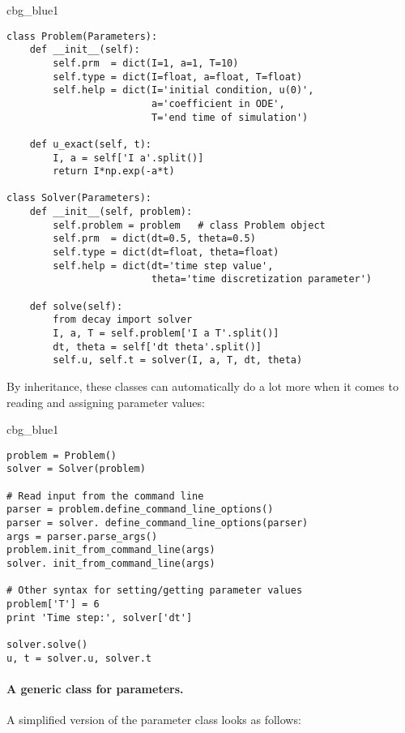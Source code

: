 \documentclass[graybox,sectrefs,envcountresetchap,open=right,final]{svmonodo}
\newenvironment{_cod_tight}[1]{
   \def\FrameCommand{\colorbox{#1}}
   \FrameRule0.6pt\MakeFramed {\FrameRestore}\vskip3mm}
   {\vskip0mm\endMakeFramed}
\newenvironment{cod}[1]{
\bgroup\rmfamily
\fboxsep=0mm\relax
\begin{_cod_tight}{#1}
\list{}{\parsep=-2mm\parskip=0mm\topsep=0pt\leftmargin=2mm
\rightmargin=2\leftmargin\leftmargin=4pt\relax}
\item\relax}
{\endlist\end{_cod_tight}\egroup}
\begin{document}
\begin{cod}{cbg_blue1}\begin{Verbatim}[numbers=none,fontsize=\fontsize{9pt}{9pt},baselinestretch=0.95,xleftmargin=2mm]
class Problem(Parameters):
    def __init__(self):
        self.prm  = dict(I=1, a=1, T=10)
        self.type = dict(I=float, a=float, T=float)
        self.help = dict(I='initial condition, u(0)',
                         a='coefficient in ODE',
                         T='end time of simulation')

    def u_exact(self, t):
        I, a = self['I a'.split()]
        return I*np.exp(-a*t)

class Solver(Parameters):
    def __init__(self, problem):
        self.problem = problem   # class Problem object
        self.prm  = dict(dt=0.5, theta=0.5)
        self.type = dict(dt=float, theta=float)
        self.help = dict(dt='time step value',
                         theta='time discretization parameter')

    def solve(self):
        from decay import solver
        I, a, T = self.problem['I a T'.split()]
        dt, theta = self['dt theta'.split()]
        self.u, self.t = solver(I, a, T, dt, theta)
\end{Verbatim}
\end{cod}
\noindent
By inheritance, these classes can automatically do a lot more when it comes to
reading and assigning parameter values:

\begin{cod}{cbg_blue1}\begin{Verbatim}[numbers=none,fontsize=\fontsize{9pt}{9pt},baselinestretch=0.95,xleftmargin=2mm]
problem = Problem()
solver = Solver(problem)

# Read input from the command line
parser = problem.define_command_line_options()
parser = solver. define_command_line_options(parser)
args = parser.parse_args()
problem.init_from_command_line(args)
solver. init_from_command_line(args)

# Other syntax for setting/getting parameter values
problem['T'] = 6
print 'Time step:', solver['dt']

solver.solve()
u, t = solver.u, solver.t
\end{Verbatim}
\end{cod}
\noindent

\paragraph{A generic class for parameters.}
A simplified version of the parameter class looks as follows:
\end{document}
